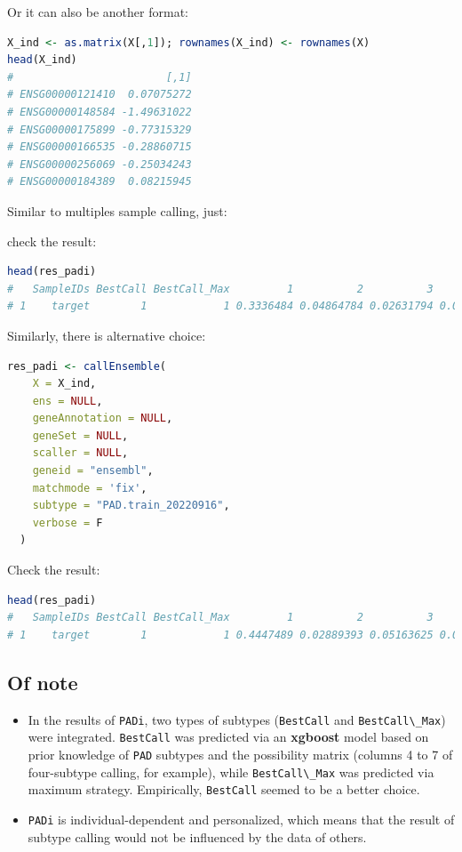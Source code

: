\documentclass[
  12pt,
]{book}
\newcommand{\passthrough}[1]{#1}
\begin{document}
Or it can also be another format:

\begin{lstlisting}[language=R]
X_ind <- as.matrix(X[,1]); rownames(X_ind) <- rownames(X)
head(X_ind)
#                        [,1]
# ENSG00000121410  0.07075272
# ENSG00000148584 -1.49631022
# ENSG00000175899 -0.77315329
# ENSG00000166535 -0.28860715
# ENSG00000256069 -0.25034243
# ENSG00000184389  0.08215945
\end{lstlisting}

Similar to multiples sample calling, just:

check the result:

\begin{lstlisting}[language=R]
head(res_padi)
#   SampleIDs BestCall BestCall_Max         1          2          3          4
# 1    target        1            1 0.3336484 0.04864784 0.02631794 0.02337278
\end{lstlisting}

Similarly, there is alternative choice:

\begin{lstlisting}[language=R]
res_padi <- callEnsemble(
    X = X_ind,
    ens = NULL,
    geneAnnotation = NULL,
    geneSet = NULL,
    scaller = NULL,
    geneid = "ensembl",
    matchmode = 'fix',
    subtype = "PAD.train_20220916",
    verbose = F
  )
\end{lstlisting}

Check the result:

\begin{lstlisting}[language=R]
head(res_padi)
#   SampleIDs BestCall BestCall_Max         1          2          3          4
# 1    target        1            1 0.4447489 0.02889393 0.05163625 0.01895758
\end{lstlisting}

\hypertarget{of-note-1}{%
\subsection{Of note}\label{of-note-1}}

\begin{itemize}
\item
  In the results of \passthrough{\lstinline!PADi!}, two types of subtypes (\passthrough{\lstinline!BestCall!} and \passthrough{\lstinline!BestCall\_Max!}) were integrated. \passthrough{\lstinline!BestCall!} was predicted via an \textbf{xgboost} model based on prior knowledge of \passthrough{\lstinline!PAD!} subtypes and the possibility matrix (columns 4 to 7 of four-subtype calling, for example), while \passthrough{\lstinline!BestCall\_Max!} was predicted via maximum strategy. Empirically, \passthrough{\lstinline!BestCall!} seemed to be a better choice.
\item
  \passthrough{\lstinline!PADi!} is individual-dependent and personalized, which means that the result of subtype calling would not be influenced by the data of others.
\end{itemize}
\end{document}
